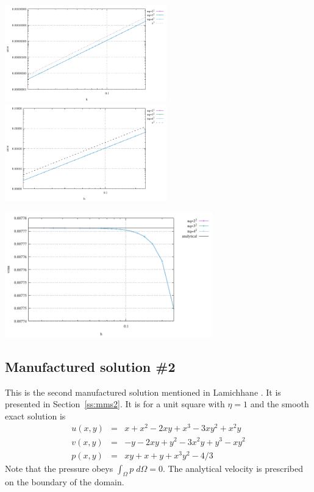 \begin{center}
\includegraphics[width=7cm]{python_codes/fieldstone_76/results/mms1/errors_v}
\includegraphics[width=7cm]{python_codes/fieldstone_76/results/mms1/errors_p}
\end{center}

\begin{center}
\includegraphics[width=9cm]{python_codes/fieldstone_76/results/mms1/vrms}
\end{center}

\subsection*{Manufactured solution \#2}

This is the second manufactured solution 
mentioned in Lamichhane \cite{lami17}. It is presented in Section~\ref{ss:mms2}.
It is for a unit square with $\eta=1$ and the smooth exact solution is
\begin{eqnarray}
u(x,y) &=& x+x^2 - 2xy+x^3 - 3xy^2 + x^2y \\
v(x,y) &=& -y-2xy+y^2 -3x^2y + y^3 - xy^2 \\
p(x,y) &=& xy+x+y+x^3y^2 - 4/3
\end{eqnarray}
Note that the pressure obeys $\int_{\Omega} p \; d\Omega = 0$. The analytical 
velocity is prescribed on the boundary of the domain. 



